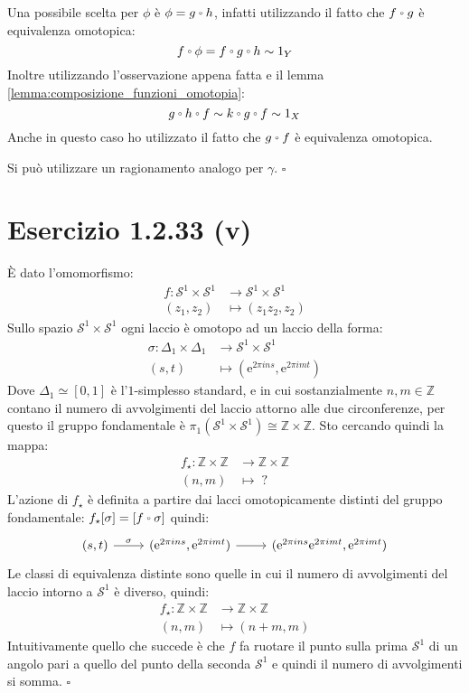 \documentclass[10pt]{scrartcl}
\newcommand{\Z}{\mathbb{Z}}
\newcommand{\Sph}[1][]{\mathcal{S}^#1}
\let\latexcirc=\circ
\newcommand{\ccirc}{\mathbin{\mathchoice
  {\xcirc\scriptstyle}
  {\xcirc\scriptstyle}
  {\xcirc\scriptscriptstyle}
  {\xcirc\scriptscriptstyle}
}}
\newcommand{\xcirc}[1]{\vcenter{\hbox{$#1\latexcirc$}}}
\let\circ\ccirc
\begin{document}
Una possibile scelta per $ \phi $ è $ \phi = g \circ h $, infatti utilizzando
il fatto che $ f \circ g $ è equivalenza omotopica:
\[
  f \circ \phi = f \circ g \circ h \sim 1_Y
\]
Inoltre utilizzando l'osservazione appena fatta e il lemma
\ref{lemma:composizione_funzioni_omotopia}:
\[
  g \circ h \circ f \sim k \circ g \circ f \sim 1_X
\]
Anche in questo caso ho utilizzato il fatto che $ g \circ f $ è equivalenza
omotopica.

Si può utilizzare un ragionamento analogo per $ \gamma $.
\hfill $ \square $

\section{Esercizio 1.2.33 (v)}
È dato l'omomorfismo:
\begin{align*}
  f \colon \Sph{1} \times \Sph{1} & \to  \Sph{1} \times \Sph{1} \\
  (z_1, z_2) & \mapsto (z_1 z_2, z_2)
\end{align*}
Sullo spazio $ \Sph{1} \times \Sph{1} $ ogni laccio è
omotopo ad un laccio della forma:
\begin{align*}
  \sigma \colon \Delta_1 \times \Delta_1 & \to \Sph{1} \times \Sph{1} \\
  (s,t) & \mapsto (\mathrm{e}^{2 \pi i n s}, \mathrm{e}^{2 \pi i m t})
\end{align*}
Dove $ \Delta_1 \simeq [0,1] $ è l'$ 1 $-simplesso standard, e in
cui sostanzialmente $ n, m \in \Z $ contano il numero
di avvolgimenti del laccio attorno alle due circonferenze,
per questo il gruppo fondamentale è $ \pi_1(\Sph{1} \times \Sph{1})
\cong \Z \times \Z $. Sto cercando quindi la mappa:
\begin{align*}
  f_\star \colon \Z \times \Z & \to \Z \times \Z \\
  (n, m) & \mapsto \; ?
\end{align*}
L'azione di $ f_\star $ è definita a partire dai lacci
omotopicamente distinti del gruppo fondamentale:
$ f_\star[\sigma] = [f \circ \sigma] $ quindi:
\[
  \begin{tikzcd}
    (s,t) \rar{\sigma} &  (\mathrm{e}^{2 \pi i n s}, \mathrm{e}^{2 \pi i m t}) \rar &
     (\mathrm{e}^{2 \pi i n s} \mathrm{e}^{2 \pi i m t}, \mathrm{e}^{2 \pi i m t})
  \end{tikzcd}
\]
Le classi di equivalenza distinte sono quelle in cui il numero
di avvolgimenti del laccio intorno a $ \Sph{1} $ è diverso,
quindi:
\begin{align*}
  f_\star \colon \Z \times \Z & \to \Z \times \Z \\
  (n, m) & \mapsto (n+m, m)
\end{align*}
Intuitivamente quello che succede è che $ f $ fa ruotare il punto
sulla prima $ \Sph{1} $ di un angolo pari a quello del punto della seconda
$ \Sph{1} $ e quindi il numero di avvolgimenti si somma.
\hfill $ \square $
\end{document}
